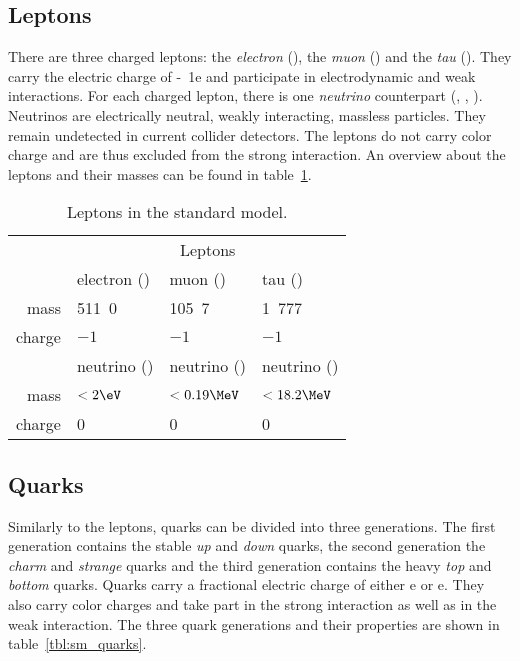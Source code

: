 \subsection{Leptons}
There are three charged leptons: the \emph{electron} (\Pe), the \emph{muon} (\Pmu) and the \emph{tau} (\Ptau). They carry the electric charge of \unit{-1}{e} and participate in electrodynamic and weak interactions. For each charged lepton, there is one \emph{neutrino} counterpart (\Pnue, \Pnum, \Pnut). Neutrinos are electrically neutral, weakly interacting, massless particles. They remain undetected in current collider detectors.
The leptons do not carry color charge and are thus excluded from the strong interaction.
An overview about the leptons and their masses can be found in table~\ref{tbl:sm_leptons}.

\begin{table}[htbp]
	\centering
	\begin{tabular}{ r | l | l | l | }
		\cline{2-4}
		& \multicolumn{3}{c|}{Leptons} \\ \cline{2-4}
		& electron (\Pe) & muon (\Pmu) & tau (\Ptau) \\ \cline{2-4}
		mass & \unit{511.0}{\keV} & \unit{105.7}{\MeV} & \unit{1.777}{\GeV} \\ \cline{2-4}
		charge & $-1$ & $-1$ & $-1$ \\ \cline{2-4}
		& \Pe neutrino (\Pnue) & \Pmu neutrino (\Pnum) & \Ptau neutrino (\Pnut) \\ \cline{2-4}
		mass & $< \unit{2}{\eV}$ & $< \unit{0.19}{\MeV}$ & $< \unit{18.2}{\MeV}$ \\ \cline{2-4}
		charge & 0 & 0 & 0 \\ \cline{2-4}
	\end{tabular}
	\caption{Leptons in the standard model\cite[p.~30, p.~690f.]{Oo2014Review}.}
	\label{tbl:sm_leptons}
\end{table}

\subsection{Quarks}
Similarly to the leptons, quarks can be divided into three generations. The first generation contains the stable \emph{up} and \emph{down} quarks, the second generation the \emph{charm} and \emph{strange} quarks and the third generation contains the heavy \emph{top} and \emph{bottom} quarks. Quarks carry a fractional electric charge of either \unit{}{e} or \unit{}{e}.
They also carry color charges and take part in the strong interaction as well as in the weak interaction.
The three quark generations and their properties are shown in table~\ref{tbl:sm_quarks}.

